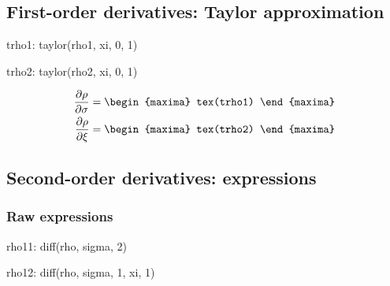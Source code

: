 \subsection{First-order derivatives: Taylor approximation}

\begin{maxima}
  trho1: taylor(rho1, xi, 0, 1)
\end{maxima}

\begin{maxima}
  trho2: taylor(rho2, xi, 0, 1)
\end{maxima}

{\color{MonVertF}
\begin{align*}
\frac{\partial \rho}{\partial \sigma}  &=
\begin{maxima}
 tex(trho1)
\end{maxima}
\\
\frac{\partial \rho}{\partial \xi} &=
\begin{maxima}
 tex(trho2)
\end{maxima}
\end{align*}
}


\subsection{Second-order derivatives: expressions}

\subsubsection*{Raw expressions}
\begin{maxima}
  rho11:  diff(rho, sigma, 2)
\end{maxima}

\begin{maxima}
  rho12:  diff(rho, sigma, 1, xi, 1)
\end{maxima}

